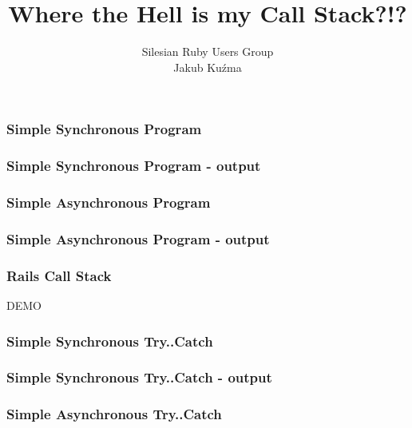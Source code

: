\documentclass[16pt]{beamer}
\author{Silesian Ruby Users Group\\\footnotesize{Jakub Kuźma}}
\title{Where the Hell is my Call Stack?!?}
\begin{document}
\frame{\titlepage}

\begin{frame}[fragile]
  \frametitle{Simple Synchronous Program}
  \begin{footnotesize}
    
  \end{footnotesize}
\end{frame}

\begin{frame}[fragile]
  \frametitle{Simple Synchronous Program - output}
  \begin{scriptsize}
    
  \end{scriptsize}
\end{frame}

\begin{frame}[fragile]
  \frametitle{Simple Asynchronous Program}
  \begin{footnotesize}
    
  \end{footnotesize}
\end{frame}

\begin{frame}[fragile]
  \frametitle{Simple Asynchronous Program - output}
  \begin{scriptsize}
    
  \end{scriptsize}
\end{frame}

\begin{frame}
  \frametitle{Rails Call Stack}
  \begin{center}
    DEMO
  \end{center}
\end{frame}

\begin{frame}[fragile]
  \frametitle{Simple Synchronous Try..Catch}
  \begin{footnotesize}
    
  \end{footnotesize}
\end{frame}

\begin{frame}[fragile]
  \frametitle{Simple Synchronous Try..Catch - output}
  \begin{scriptsize}
    
  \end{scriptsize}
\end{frame}

\begin{frame}[fragile]
  \frametitle{Simple Asynchronous Try..Catch}
  \begin{footnotesize}
    
  \end{footnotesize}
\end{frame}
\end{document}
